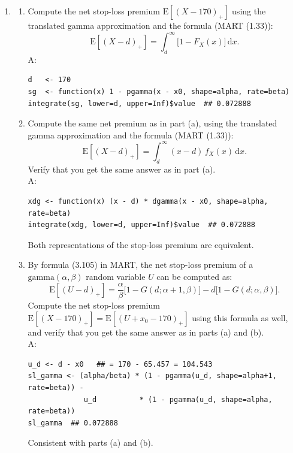 \documentclass{article}
\begin{document}
\begin{enumerate}
  \item[$\boldsymbol{Q_6}$]
    \begin{enumerate}
      \item[(a)] Compute the net stop-loss premium $\mathrm{E}[(X-170)_+]$ using the translated gamma approximation and the formula (MART (1.33)):
      \[
        \mathrm{E}[(X-d)_+] = \int_d^{\infty} \bigl[1 - F_X(x)\bigr]\,\mathrm{d}x.
      \]
      A:

\begin{lstlisting}
d   <- 170
sg  <- function(x) 1 - pgamma(x - x0, shape=alpha, rate=beta)
integrate(sg, lower=d, upper=Inf)$value  ## 0.072888
\end{lstlisting}

      \item[(b)] Compute the same net premium as in part (a), using the translated gamma approximation and the formula (MART (1.33)):
      \[
        \mathrm{E}[(X-d)_+] = \int_d^{\infty} (x-d)\,f_X(x)\,\mathrm{d}x.
      \]
      Verify that you get the same answer as in part (a). \\A:
\begin{lstlisting}
xdg <- function(x) (x - d) * dgamma(x - x0, shape=alpha, rate=beta)
integrate(xdg, lower=d, upper=Inf)$value  ## 0.072888
\end{lstlisting}

      Both representations of the stop-loss premium are equivalent.

      \item[(c)] By formula (3.105) in MART, the net stop-loss premium of a $\mathrm{gamma}(\alpha,\beta)$ random variable $U$ can be computed as:
      \[
        \mathrm{E}[(U-d)_+] = \frac{\alpha}{\beta}\bigl[1 - G(d;\alpha+1,\beta)\bigr] - d\bigl[1 - G(d;\alpha,\beta)\bigr].
      \]
      Compute the net stop-loss premium $\mathrm{E}[(X-170)_+] = \mathrm{E}[(U+x_0-170)_+]$ using this formula as well, and verify that you get the same answer as in parts (a) and (b). \\A:

\begin{lstlisting}
u_d <- d - x0   ## = 170 - 65.457 = 104.543
sl_gamma <- (alpha/beta) * (1 - pgamma(u_d, shape=alpha+1, rate=beta)) -
             u_d          * (1 - pgamma(u_d, shape=alpha,   rate=beta))
sl_gamma  ## 0.072888
\end{lstlisting}

      Consistent with parts (a) and (b).
    \end{enumerate}
\end{enumerate}
\end{document}
